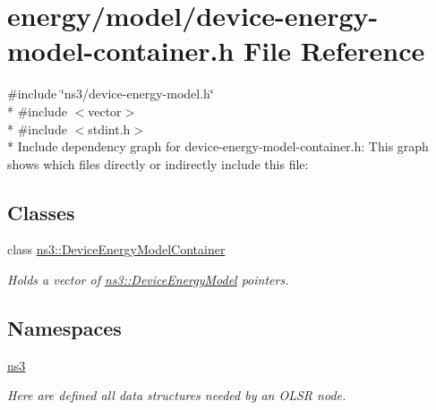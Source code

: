 \hypertarget{device-energy-model-container_8h}{}\section{energy/model/device-\/energy-\/model-\/container.h File Reference}
\label{device-energy-model-container_8h}
{\ttfamily \#include \char`\"{}ns3/device-\/energy-\/model.\+h\char`\"{}}\\*
{\ttfamily \#include $<$vector$>$}\\*
{\ttfamily \#include $<$stdint.\+h$>$}\\*
Include dependency graph for device-\/energy-\/model-\/container.h\+:
This graph shows which files directly or indirectly include this file\+:
\subsection*{Classes}
\begin{DoxyCompactItemize}
\item 
class \hyperlink{classns3_1_1DeviceEnergyModelContainer}{ns3\+::\+Device\+Energy\+Model\+Container}
\begin{DoxyCompactList}\small\item\em Holds a vector of \hyperlink{classns3_1_1DeviceEnergyModel}{ns3\+::\+Device\+Energy\+Model} pointers. \end{DoxyCompactList}\end{DoxyCompactItemize}
\subsection*{Namespaces}
\begin{DoxyCompactItemize}
\item 
 \hyperlink{namespacens3}{ns3}
\begin{DoxyCompactList}\small\item\em Here are defined all data structures needed by an O\+L\+SR node. \end{DoxyCompactList}\end{DoxyCompactItemize}
